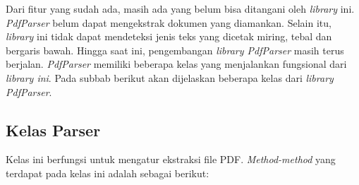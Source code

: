 Dari fitur yang sudah ada, masih ada yang belum bisa ditangani oleh \textit{library} ini. \textit{PdfParser} belum dapat mengekstrak dokumen yang diamankan. Selain itu, \textit{library} ini tidak dapat mendeteksi jenis teks yang dicetak miring, tebal dan bergaris bawah. Hingga saat ini, pengembangan \textit{library PdfParser} masih terus berjalan. \textit{PdfParser} memiliki beberapa kelas yang menjalankan fungsional dari \textit{library ini}. Pada subbab berikut akan dijelaskan beberapa kelas dari \textit{library PdfParser}.

\subsection{Kelas Parser}
Kelas ini berfungsi untuk mengatur ekstraksi file PDF. \textit{Method-method} yang terdapat pada kelas ini adalah sebagai berikut:


